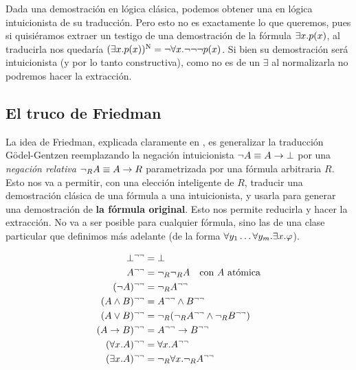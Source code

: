 Dada una demostración en lógica clásica, podemos obtener una en lógica
intuicionista de su traducción. Pero esto no es exactamente lo que queremos,
pues si quisiéramos extraer un testigo de una demostración de la fórmula
$\exists x. p(x)$, al traducirla nos quedaría
\(
(\exists x. p(x))^{\text{N}}
= \neg \forall x . \neg\neg\neg p(x)
\).
Si bien su demostración será intuicionista (y por lo tanto constructiva),
como no es de un $\exists$ al normalizarla no podremos hacer la extracción.

\subsection{El truco de Friedman}

La idea de Friedman, explicada claramente en \cite{miquel-friedman}, es
generalizar la traducción Gödel-Gentzen reemplazando la negación intuicionista
$\neg A \equiv A \rightarrow \bot$ por una \textit{negación relativa} $\neg_R A
\equiv A \rightarrow R$ parametrizada por una fórmula arbitraria $R$. Esto
nos va a permitir, con una elección inteligente de $R$, traducir una
demostración clásica de una fórmula a una intuicionista, y usarla para generar
una demostración de \textbf{la fórmula original}. Esto nos permite reducirla y
hacer la extracción. No va a ser posible para cualquier fórmula, sino las de una
clase particular que definimos más adelante (de la forma $\forall y_1
\dots \forall y_m . \exists x . \varphi$).

\begin{definition}
    \begin{align*}
        \bot^{\neg\neg}                         & = \bot                                                             \\
        A^{\neg\neg}                        & = \neg_R\neg_R A
        \quad \text{con $A$ atómica}                                                                              \\
        (\neg A)^{\neg\neg}                & = \neg_R A^{\neg\neg}                                          \\
        (A \wedge B)^{\neg\neg}       & = A^{\neg\neg} \wedge B^{\neg\neg}                     \\
        (A \vee B)^{\neg\neg}        & = \neg_R(\neg_RA^{\neg\neg} \wedge \neg_RB^{\neg\neg}) \\
        (A \rightarrow B)^{\neg\neg} & = A^{\neg\neg} \rightarrow B^{\neg\neg}               \\
        (\forall x . A)^{\neg\neg}          & = \forall x . A^{\neg\neg}                                    \\
        (\exists x . A)^{\neg\neg}          & = \neg_R \forall x . \neg_R A^{\neg\neg}
    \end{align*}
\end{definition}

